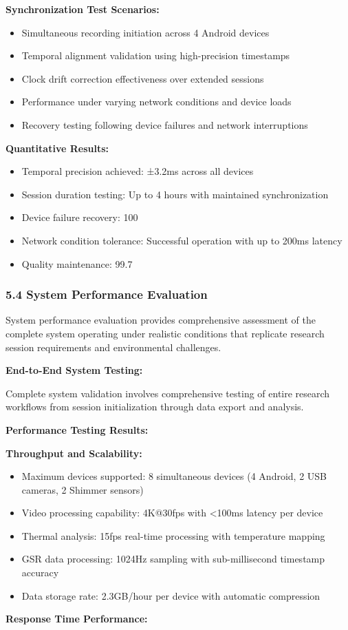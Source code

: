 \documentclass[12pt,a4paper]{report}
\begin{document}
\textbf{Synchronization Test Scenarios:}

\begin{itemize}
\item Simultaneous recording initiation across 4 Android devices
\item Temporal alignment validation using high-precision timestamps
\item Clock drift correction effectiveness over extended sessions
\item Performance under varying network conditions and device loads
\item Recovery testing following device failures and network interruptions

\end{itemize}
\textbf{Quantitative Results:}

\begin{itemize}
\item Temporal precision achieved: ±3.2ms across all devices
\item Session duration testing: Up to 4 hours with maintained synchronization
\item Device failure recovery: 100%
\item Network condition tolerance: Successful operation with up to 200ms latency
\item Quality maintenance: 99.7%

\end{itemize}
\subsubsection{5.4 System Performance Evaluation}

System performance evaluation provides comprehensive assessment of the complete system operating under realistic
conditions that replicate research session requirements and environmental challenges.

\textbf{End-to-End System Testing:}

Complete system validation involves comprehensive testing of entire research workflows from session initialization
through data export and analysis.

\textbf{Performance Testing Results:}

\textbf{Throughput and Scalability:}

\begin{itemize}
\item Maximum devices supported: 8 simultaneous devices (4 Android, 2 USB cameras, 2 Shimmer sensors)
\item Video processing capability: 4K@30fps with <100ms latency per device
\item Thermal analysis: 15fps real-time processing with temperature mapping
\item GSR data processing: 1024Hz sampling with sub-millisecond timestamp accuracy
\item Data storage rate: 2.3GB/hour per device with automatic compression

\end{itemize}
\textbf{Response Time Performance:}
\end{document}
